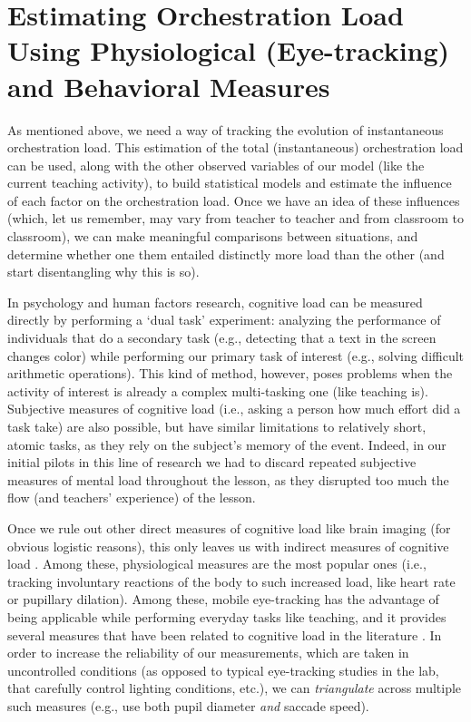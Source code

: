 \documentclass[10pt,journal,compsoc]{IEEEtran}
\begin{document}
\section{Estimating Orchestration Load Using Physiological (Eye-tracking) and Behavioral Measures}
\label{sec:measures}
As mentioned above, we need a way of tracking the evolution of instantaneous orchestration load. This estimation of the total (instantaneous) orchestration load can be used, along with the other observed variables of our model (like the current teaching activity), to build statistical models and estimate the influence of each factor on the orchestration load. Once we have an idea of these influences (which, let us remember, may vary from teacher to teacher and from classroom to classroom), we can make meaningful comparisons between situations, and determine whether one them entailed distinctly more load than the other (and start disentangling why this is so).

In psychology and human factors research, cognitive load can be measured directly by performing a `dual task' experiment: analyzing the performance of individuals that do a secondary task (e.g., detecting that a text in the screen changes color) while performing our primary task of interest (e.g., solving difficult arithmetic operations). This kind of method, however, poses problems when the activity of interest is already a complex multi-tasking one \cite{Paas2003} (like teaching is). Subjective measures of cognitive load (i.e., asking a person how much effort did a task take) are also possible, but have similar limitations to relatively short, atomic tasks, as they rely on the subject's memory of the event. Indeed, in our initial pilots in this line of research we had to discard repeated subjective measures of mental load throughout the lesson, as they disrupted too much the flow (and teachers' experience) of the lesson.

Once we rule out other direct measures of cognitive load like brain imaging (for obvious logistic reasons), this only leaves us with indirect measures of cognitive load \cite{Brunken2003}. Among these, physiological measures are the most popular ones (i.e., tracking involuntary reactions of the body to such increased load, like heart rate or pupillary dilation). Among these, mobile eye-tracking has the advantage of being applicable while performing everyday tasks like teaching, and it provides several measures that have been related to cognitive load in the literature \cite{boucsein2000engineering,Buettner2013}. In order to increase the reliability of our measurements, which are taken in uncontrolled conditions (as opposed to typical eye-tracking studies in the lab, that carefully control lighting conditions, etc.), we can \textit{triangulate} across multiple such measures (e.g., use both pupil diameter \textit{and} saccade speed).
\end{document}
